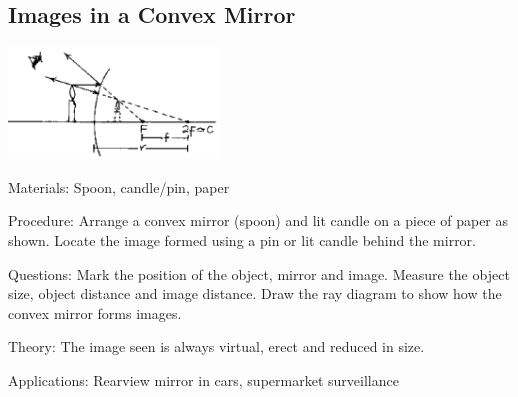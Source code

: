 \begin{multicols}{2}
\subsection{Images in a Convex Mirror}

\begin{center}
\includegraphics[width=0.42\textwidth]{./img/source/images-convex.png}
\end{center}

\begin{description*}
\item[Materials:]{Spoon, candle/pin, paper}
\item[Procedure:]{Arrange a convex mirror (spoon) and lit candle on a piece of paper as shown. Locate the image formed using a pin or lit candle behind the mirror.}
\item[Questions:]{Mark the position of the object, mirror and image. Measure the object size, object distance and image distance. Draw the ray diagram to show how the convex mirror forms images.}
\item[Theory:]{The image seen is always virtual, erect and reduced in size.}
\item[Applications:]{Rearview mirror in cars, supermarket surveillance}
\end{description*}

%
%


\end{multicols}
